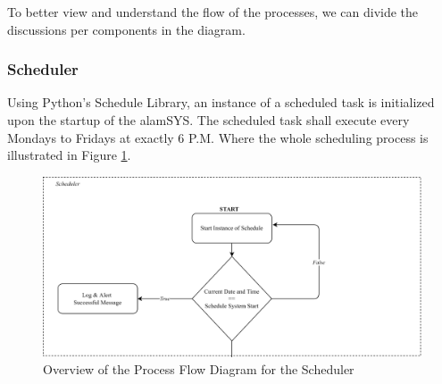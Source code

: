 To better view and understand the flow of the processes, 
we can divide the discussions per components in the diagram.

\subsubsection{Scheduler}
\label{subsubsc:scheduler}
Using Python's Schedule Library, an instance of a scheduled task
is initialized upon the startup of the alamSYS. The scheduled task
shall execute every Mondays to Fridays at exactly 6 P.M. Where
the whole scheduling process is illustrated in Figure \ref{fig:process_flowchart_scheduler}.
\hfill \\
\begin{figure}[ht]
    \centering
    \includegraphics[width=1\textwidth]{./assets/Chapter_3/PFC/ProcessFlowchart_Scheduler.png}
    \caption{Overview of the Process Flow Diagram for the Scheduler}
    \label{fig:process_flowchart_scheduler}
\end{figure}
\FloatBarrier

